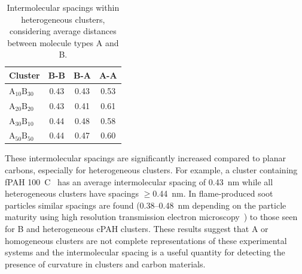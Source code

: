 %
\begin{table}[thb]
\centering
\caption{Intermolecular spacings within heterogeneous clusters, considering average distances between molecule types A and B.}
\label{table:mixedintermolecdists}
\begin{tabular}{lccc}
\hline
Cluster & B-B & B-A & A-A \\ \hline
$\text{A}_{\text{10}}\text{B}_{\text{30}}$ & 0.43 & 0.43 & 0.53 \\
$\text{A}_{\text{20}}\text{B}_{\text{20}}$ & 0.43 & 0.41 & 0.61 \\
$\text{A}_{\text{30}}\text{B}_{\text{10}}$ & 0.44 & 0.48 & 0.58 \\
$\text{A}_{\text{50}}\text{B}_{\text{50}}$ & 0.44 & 0.47 & 0.60 \\
\hline
\end{tabular}
\end{table}

%
These intermolecular spacings are significantly increased compared to planar carbons, especially for heterogeneous clusters. For example, a cluster containing fPAH 100~C~\cite{chen2014phase} has an average intermolecular spacing of 0.43~nm while all heterogeneous clusters have spacings $\geq$0.44~nm. In flame-produced soot particles similar spacings are found (0.38--0.48~nm depending on the particle maturity using high resolution transmission electron microscopy~\cite{botero2019internal,apicella2015soot}) to those seen for B and heterogeneous cPAH clusters. These results suggest that A or homogeneous clusters are not complete representations of these experimental systems and the intermolecular spacing is a useful quantity for detecting the presence of curvature in clusters and carbon materials. 

